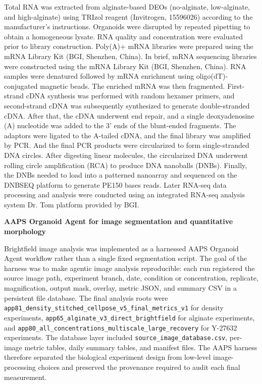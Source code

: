 \documentclass[
]{article}
\begin{document}
Total RNA was extracted from alginate-based DEOs (no-alginate, low-alginate, and high-alginate) using TRIzol reagent (Invitrogen, 15596026) according to the manufacturer's instructions. Organoids were disrupted by repeated pipetting to obtain a homogeneous lysate. RNA quality and concentration were evaluated prior to library construction. Poly(A)+ mRNA libraries were prepared using the mRNA Library Kit (BGI, Shenzhen, China). In brief, mRNA sequencing libraries were constructed using the mRNA Library Kit (BGI, Shenzhen, China). RNA samples were denatured followed by mRNA enrichment using oligo(dT)-conjugated magnetic beads. The enriched mRNA was then fragmented. First-strand cDNA synthesis was performed with random hexamer primers, and second-strand cDNA was subsequently synthesized to generate double-stranded cDNA. After that, the cDNA underwent end repair, and a single deoxyadenosine (A) nucleotide was added to the 3' ends of the blunt-ended fragments. The adaptors were ligated to the A-tailed cDNA, and the final library was amplified by PCR. And the final PCR products were circularized to form single-stranded DNA circles. After digesting linear molecules, the circularized DNA underwent rolling circle amplification (RCA) to produce DNA nanoballs (DNBs). Finally, the DNBs needed to load into a patterned nanoarray and sequenced on the DNBSEQ platform to generate PE150 bases reads. Later RNA-seq data processing and analysis were conducted using an integrated RNA-seq analysis system Dr. Tom platform provided by BGI.

\textbf{AAPS Organoid Agent for image segmentation and quantitative morphology}

Brightfield image analysis was implemented as a harnessed AAPS Organoid Agent workflow rather than a single fixed segmentation script. The goal of the harness was to make agentic image analysis reproducible: each run registered the source image path, experiment branch, date, condition or concentration, replicate, magnification, output mask, overlay, metric JSON, and summary CSV in a persistent file database. The final analysis roots were \texttt{app81\_density\_stitched\_cellpose\_v5\_final\_metrics\_v1} for density experiments, \texttt{app65\_alginate\_v3\_direct\_brightfield} for alginate experiments, and \texttt{app80\_all\_concentrations\_multiscale\_large\_recovery} for Y-27632 experiments. The database layer included \texttt{source\_image\_database.csv}, per-image metric tables, daily summary tables, and manifest files. The AAPS harness therefore separated the biological experiment design from low-level image-processing choices and preserved the provenance required to audit each final measurement.
\end{document}
